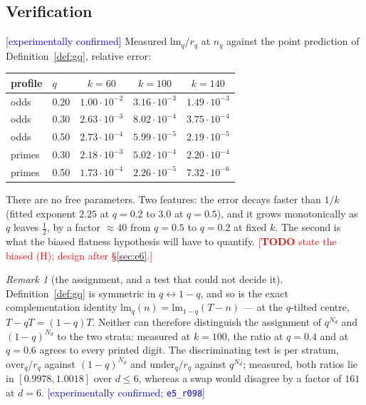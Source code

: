 \documentclass[11pt,a4paper]{article}
\theoremstyle{plain}
\theoremstyle{definition}
\theoremstyle{remark}
\newtheorem{remark}[theorem]{Remark}
\newcommand{\lm}{\mathrm{lm}}
\newcommand{\TODO}[1]{\textcolor{red}{[\textbf{TODO} #1]}}
\newcommand{\STATUS}[1]{\textcolor{blue}{\textsf{[#1]}}}
\begin{document}
\subsection{Verification}\label{sec:e5}

\STATUS{experimentally confirmed} Measured $\lm_q/r_q$ at $n_q$ against the point
prediction of Definition~\ref{def:gq}, relative error:

\begin{center}
\begin{tabular}{llccc}
\toprule
profile & $q$ & $k=60$ & $k=100$ & $k=140$\\
\midrule
odds & 0.20 & $1.00\cdot10^{-2}$ & $3.16\cdot10^{-3}$ & $1.49\cdot10^{-3}$\\
odds & 0.30 & $2.63\cdot10^{-3}$ & $8.02\cdot10^{-4}$ & $3.75\cdot10^{-4}$\\
odds & 0.50 & $2.73\cdot10^{-4}$ & $5.99\cdot10^{-5}$ & $2.19\cdot10^{-5}$\\
primes & 0.30 & $2.18\cdot10^{-3}$ & $5.02\cdot10^{-4}$ & $2.20\cdot10^{-4}$\\
primes & 0.50 & $1.73\cdot10^{-4}$ & $2.26\cdot10^{-5}$ & $7.32\cdot10^{-6}$\\
\bottomrule
\end{tabular}
\end{center}

\noindent
There are no free parameters. Two features: the error decays faster than $1/k$ (fitted
exponent $2.25$ at $q=0.2$ to $3.0$ at $q=0.5$), and it grows monotonically as $q$ leaves
$\tfrac12$, by a factor $\approx40$ from $q=0.5$ to $q=0.2$ at fixed $k$. The second is what
the biased flatness hypothesis will have to quantify. \TODO{state the biased (H); design
after \S\ref{sec:e6}.}

\begin{remark}[the assignment, and a test that could not decide it]\label{rem:assign}
Definition~\ref{def:gq} is symmetric in $q\leftrightarrow1-q$, and so is the exact
complementation identity $\lm_q(n)=\lm_{1-q}(T-n)$ --- at the $q$-tilted centre,
$T-qT=(1-q)T$. Neither can therefore distinguish the assignment of $q^{N_d}$ and
$(1-q)^{N_d}$ to the two strata: measured at $k=100$, the ratio at $q=0.4$ and at $q=0.6$
agrees to every printed digit. The discriminating test is per stratum,
$\mathrm{over}_q/r_q$ against $(1-q)^{N_d}$ and $\mathrm{under}_q/r_q$ against
$q^{N_d}$; measured, both ratios lie in $[0.9978,1.0018]$ over $d\le6$, whereas a swap would
disagree by a factor of $161$ at $d=6$. \STATUS{experimentally confirmed; \texttt{e5\_r098}}
\end{remark}
\end{document}
